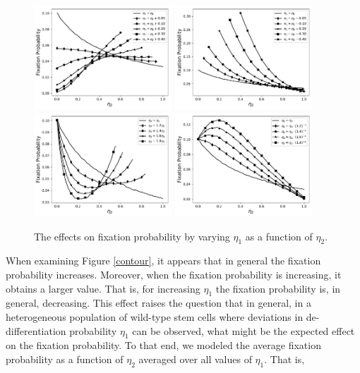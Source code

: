 \documentclass[12pt]{article}
\begin{document}
\begin{figure}[H]
\begin{center}
\includegraphics[width=0.46\textwidth]{eta_plus_const.pdf}
\includegraphics[width=0.46\textwidth]{eta_minus_const.pdf}\\
\includegraphics[width=0.46\textwidth]{eta_times_const.pdf}
\includegraphics[width=0.46\textwidth]{eta_div_const.pdf}
\end{center}
\caption{The effects on fixation probability by varying $\eta_1$ as a function of $\eta_2$.}\label{eta_stack}
\end{figure}

When examining Figure \ref{contour}, it appears that in general the fixation probability increases. Moreover, when the fixation probability is increasing, it obtains a larger value. That is, for increasing $\eta_1$ the fixation probability is, in general, decreasing. This effect raises the question that in general, in a heterogeneous population of wild-type stem cells where deviations in de-differentiation probability $\eta_1$ can be observed, what might be the expected effect on the fixation probability. To that end, we modeled the average fixation probability as a function of $\eta_2$ averaged over all values of $\eta_1$. That is,
\end{document}
